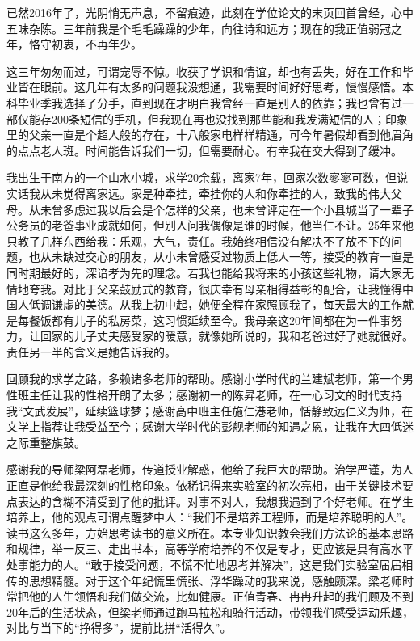 \begin{thanks}

已然2016年了，光阴悄无声息，不留痕迹，此刻在学位论文的末页回首曾经，心中五味杂陈。三年前我是个毛毛躁躁的少年，向往诗和远方；现在的我正值弱冠之年，恪守初衷，不再年少。

这三年匆匆而过，可谓宠辱不惊。收获了学识和情谊，却也有丢失，好在工作和毕业皆在眼前。这几年有太多的问题我没想通，我需要时间好好思考，慢慢感悟。本科毕业季我选择了分手，直到现在才明白我曾经一直是别人的依靠；我也曾有过一部仅能存200条短信的手机，但我现在再也没找到那些能和我发满短信的人；印象里的父亲一直是个超人般的存在，十八般家电样样精通，可今年暑假却看到他眉角的点点老人斑。时间能告诉我们一切，但需要耐心。有幸我在交大得到了缓冲。

我出生于南方的一个山水小城，求学20余载，离家7年，回家次数寥寥可数，但说实话我从未觉得离家远。家是种牵挂，牵挂你的人和你牵挂的人，致我的伟大父母。从未曾多虑过我以后会是个怎样的父亲，也未曾评定在一个小县城当了一辈子公务员的老爸事业成就如何，但别人问我偶像是谁的时候，他当仁不让。25年来他只教了几样东西给我：乐观，大气，责任。我始终相信没有解决不了放不下的问题，也从未缺过交心的朋友，从小未曾感受过物质上低人一等，接受的教育一直是同时期最好的，深谙孝为先的理念。若我也能给我将来的小孩这些礼物，请大家无情地夸我。对比于父亲鼓励式的教育，很庆幸有母亲相得益彰的配合，让我懂得中国人低调谦虚的美德。从我上初中起，她便全程在家照顾我了，每天最大的工作就是每餐饭都有儿子的私房菜，这习惯延续至今。我母亲这20年间都在为一件事努力，让回家的儿子丈夫感受家的暖意，就像她所说的，我和老爸过好了她就很好。责任另一半的含义是她告诉我的。

回顾我的求学之路，多赖诸多老师的帮助。感谢小学时代的兰建斌老师，第一个男性班主任让我的性格开朗了太多；感谢初一的陈昇老师，在一心习文的时代支持我“文武发展”，延续篮球梦；感谢高中班主任施仁港老师，恬静致远仁义为师，在文学上指荐让我受益至今；感谢大学时代的彭舰老师的知遇之恩，让我在大四低迷之际重整旗鼓。

感谢我的导师梁阿磊老师，传道授业解惑，他给了我巨大的帮助。治学严谨，为人正直是他给我最深刻的性格印象。依稀记得来实验室的初次亮相，由于关键技术要点表达的含糊不清受到了他的批评。对事不对人，我想我遇到了个好老师。在学生培养上，他的观点可谓点醒梦中人：“我们不是培养工程师，而是培养聪明的人”。读书这么多年，方始思考读书的意义所在。本专业知识教会我们方法论的基本思路和规律，举一反三、走出书本，高等学府培养的不仅是专才，更应该是具有高水平处事能力的人。“敢于接受问题，不慌不忙地思考并解决”，这是我们实验室届届相传的思想精髓。对于这个年纪慌里慌张、浮华躁动的我来说，感触颇深。梁老师时常把他的人生领悟和我们做交流，比如健康。正值青春、冉冉升起的我们顾及不到20年后的生活状态，但梁老师通过跑马拉松和骑行活动，带领我们感受运动乐趣，对比与当下的“挣得多”，提前比拼“活得久”。


\end{thanks}
